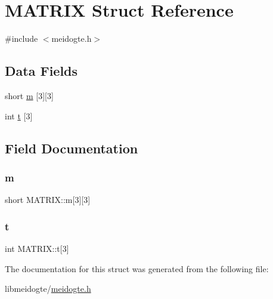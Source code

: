 \hypertarget{structMATRIX}{}\section{M\+A\+T\+R\+IX Struct Reference}
\label{structMATRIX}


{\ttfamily \#include $<$meidogte.\+h$>$}

\subsection*{Data Fields}
\begin{DoxyCompactItemize}
\item 
short \hyperlink{structMATRIX_aa03ac8ccfb1dfc125caf051bd6be284c}{m} \mbox{[}3\mbox{]}\mbox{[}3\mbox{]}
\item 
int \hyperlink{structMATRIX_a683b85e2f9808d67ab70a0ebdb352705}{t} \mbox{[}3\mbox{]}
\end{DoxyCompactItemize}


\subsection{Field Documentation}
\mbox{\label{structMATRIX_aa03ac8ccfb1dfc125caf051bd6be284c}} 
\subsubsection{\texorpdfstring{m}{m}}
{\footnotesize\ttfamily short M\+A\+T\+R\+I\+X\+::m\mbox{[}3\mbox{]}\mbox{[}3\mbox{]}}

\mbox{\label{structMATRIX_a683b85e2f9808d67ab70a0ebdb352705}} 
\subsubsection{\texorpdfstring{t}{t}}
{\footnotesize\ttfamily int M\+A\+T\+R\+I\+X\+::t\mbox{[}3\mbox{]}}



The documentation for this struct was generated from the following file\+:\begin{DoxyCompactItemize}
\item 
libmeidogte/\hyperlink{meidogte_8h}{meidogte.\+h}\end{DoxyCompactItemize}

